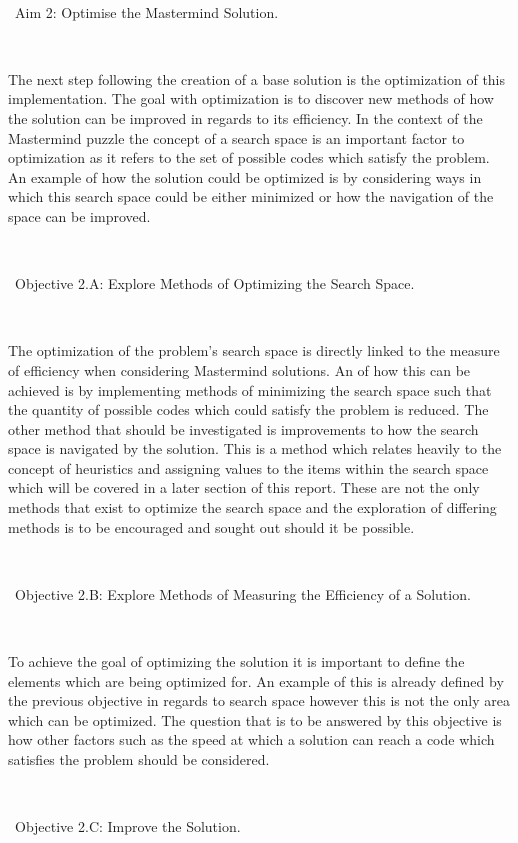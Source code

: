 \documentclass[12pt]{article}  %
\theoremstyle{definition}
\theoremstyle{remark}
\begin{document}
\

\textbullet\ Aim 2: Optimise the Mastermind Solution.

\

The next step following the creation of a base solution is the optimization of this implementation. The goal with optimization is to discover 
new methods of how the solution can be improved in regards to its efficiency. In the context of the Mastermind puzzle the concept of a 
search space is an important factor to optimization as it refers to the set of possible codes which satisfy the problem. An example of how 
the solution could be optimized is by considering ways in which this search space could be either minimized or how the navigation of the 
space can be improved.

\

\textbullet\ Objective 2.A: Explore Methods of Optimizing the Search Space.

\

The optimization of the problem's search space is directly linked to the measure of efficiency when considering Mastermind solutions. 
An of how this can be achieved is by implementing methods of minimizing the search space such that the quantity of possible codes 
which could satisfy the problem is reduced. The other method that should be investigated is improvements to how the search space 
is navigated by the solution. This is a method which relates heavily to the concept of heuristics and assigning values to the items within 
the search space which will be covered in a later section of this report. These are not the only methods that exist to optimize the 
search space and the exploration of differing methods is to be encouraged and sought out should it be possible.

\

\textbullet\ Objective 2.B: Explore Methods of Measuring the Efficiency of a Solution.

\

To achieve the goal of optimizing the solution it is important to define the elements which are being optimized for. An example of 
this is already defined by the previous objective in regards to search space however this is not the only area which can be optimized. 
The question that is to be answered by this objective is how other factors such as the speed at which a solution can reach a code 
which satisfies the problem should be considered.

\

\textbullet\ Objective 2.C: Improve the Solution.
\end{document}
